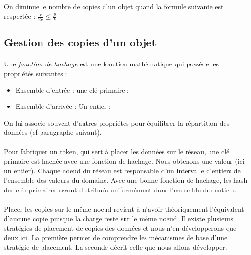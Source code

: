 \documentclass[12pt]{article}
\begin{document}
\paragraph{} On diminue le nombre de copies d'un objet quand la formule suivante est respectée : $ \frac{r}{2n} \leq \frac{p}{k} $

\subsection{Gestion des copies d'un objet}

\paragraph{} Une \textit{fonction de hachage} est une fonction mathématique qui possède les propriétés suivantes :
\begin{itemize}
    \item Ensemble d'entrée : une clé primaire ;
    \item Ensemble d'arrivée : Un entier ;
\end{itemize}
On lui associe souvent d'autres propriétés pour équilibrer la répartition des données (cf paragraphe suivant).

\paragraph{} Pour fabriquer un token, qui sert à placer les données sur le réseau, une clé primaire est hachée avec une fonction de hachage. Nous obtenons une valeur (ici un entier). Chaque noeud du réseau est responsable d'un intervalle d'entiers de l'ensemble des valeurs du domaine. Avec une bonne fonction de hachage, les hash des clés primaires seront distribués uniformément dans l'ensemble des entiers.

\paragraph{} Placer les copies sur le même noeud revient à n'avoir théoriquement l'équivalent d'aucune copie puisque la charge reste sur le même noeud. Il existe plusieurs stratégies de placement de copies des données et nous n'en développerons que deux ici. La première permet de comprendre les mécanismes de base d'une stratégie de placement. La seconde décrit celle que nous allons développer.
\end{document}
